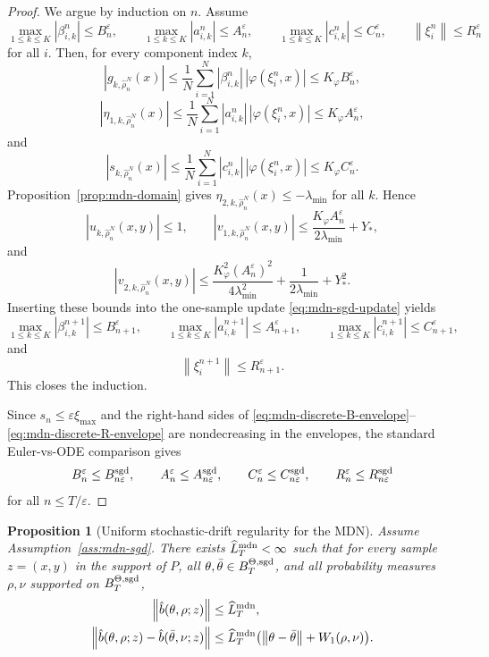 \documentclass[11pt]{article}
\newtheorem{proposition}[theorem]{Proposition}
\theoremstyle{definition}
\newcommand{\norm}[1]{\left\lVert #1 \right\rVert}
\begin{document}
\begin{proof}
We argue by induction on $n$. Assume
\[
  \max_{1\le k\le K}|\beta_{i,k}^n|\le B_n^\varepsilon,
  \qquad
  \max_{1\le k\le K}|a_{i,k}^n|\le A_n^\varepsilon,
  \qquad
  \max_{1\le k\le K}|c_{i,k}^n|\le C_n^\varepsilon,
  \qquad
  \norm{\xi_i^n}\le R_n^\varepsilon
\]
for all $i$. Then, for every component index $k$,
\[
  |g_{k,\hat\rho_n^N}(x)|
  \le
  \frac1N\sum_{i=1}^N |\beta_{i,k}^n|\,|\varphi(\xi_i^n,x)|
  \le
  K_\varphi B_n^\varepsilon,
\]
\[
  |\eta_{1,k,\hat\rho_n^N}(x)|
  \le
  \frac1N\sum_{i=1}^N |a_{i,k}^n|\,|\varphi(\xi_i^n,x)|
  \le
  K_\varphi A_n^\varepsilon,
\]
and
\[
  |s_{k,\hat\rho_n^N}(x)|
  \le
  \frac1N\sum_{i=1}^N |c_{i,k}^n|\,|\varphi(\xi_i^n,x)|
  \le
  K_\varphi C_n^\varepsilon.
\]
Proposition~\ref{prop:mdn-domain} gives
$\eta_{2,k,\hat\rho_n^N}(x)\le -\lambda_{\min}$ for all $k$. Hence
\[
  |u_{k,\hat\rho_n^N}(x,y)|\le 1,
  \qquad
  |v_{1,k,\hat\rho_n^N}(x,y)|
  \le
  \frac{K_\varphi A_n^\varepsilon}{2\lambda_{\min}}+Y_\ast,
\]
and
\[
  |v_{2,k,\hat\rho_n^N}(x,y)|
  \le
  \frac{K_\varphi^2 (A_n^\varepsilon)^2}{4\lambda_{\min}^2}
  +
  \frac{1}{2\lambda_{\min}}
  +
  Y_\ast^2.
\]
Inserting these bounds into the one-sample update
\eqref{eq:mdn-sgd-update} yields
\[
  \max_{1\le k\le K}|\beta_{i,k}^{n+1}|
  \le
  B_{n+1}^\varepsilon,
  \qquad
  \max_{1\le k\le K}|a_{i,k}^{n+1}|
  \le
  A_{n+1}^\varepsilon,
  \qquad
  \max_{1\le k\le K}|c_{i,k}^{n+1}|
  \le
  C_{n+1}^\varepsilon,
\]
and
\[
  \norm{\xi_i^{n+1}}
  \le
  R_{n+1}^\varepsilon.
\]
This closes the induction.

Since $s_n\le \varepsilon\xi_{\max}$ and the right-hand sides of
\eqref{eq:mdn-discrete-B-envelope}--\eqref{eq:mdn-discrete-R-envelope} are
nondecreasing in the envelopes, the standard Euler-vs-ODE comparison gives
\[
  B_n^\varepsilon\le B_{n\varepsilon}^{\rm sgd},
  \qquad
  A_n^\varepsilon\le A_{n\varepsilon}^{\rm sgd},
  \qquad
  C_n^\varepsilon\le C_{n\varepsilon}^{\rm sgd},
  \qquad
  R_n^\varepsilon\le R_{n\varepsilon}^{\rm sgd}
\]
for all $n\le T/\varepsilon$.
\end{proof}

\begin{proposition}[Uniform stochastic-drift regularity for the MDN]
\label{prop:mdn-sample-drift-regularity}
Assume Assumption~\ref{ass:mdn-sgd}. There exists
$\widehat L_T^{\rm mdn}<\infty$ such that for every sample $z=(x,y)$ in the
support of $P$, all $\theta,\bar\theta\in B_T^{\Theta,\rm sgd}$, and all
probability measures $\rho,\nu$ supported on $B_T^{\Theta,\rm sgd}$,
\begin{align}
  \norm{\hat b(\theta,\rho;z)}
  &\le
  \widehat L_T^{\rm mdn},
  \label{eq:mdn-sample-drift-bound}
  \\
  \norm{\hat b(\theta,\rho;z)-\hat b(\bar\theta,\nu;z)}
  &\le
  \widehat L_T^{\rm mdn}
  \bigl(\norm{\theta-\bar\theta}+W_1(\rho,\nu)\bigr).
  \label{eq:mdn-sample-drift-lipschitz}
\end{align}
\end{proposition}
\end{document}
